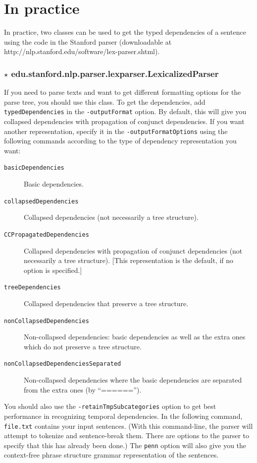 \documentclass[11pt,letterpaper]{article}
\begin{document}
\section{In practice}\label{in_practice}

In practice, two classes can be used to get the typed dependencies of a sentence using the code in the Stanford parser (downloadable at \textsf{http://nlp.stanford.edu/software/lex-parser.shtml}).

\subsubsection*{$\star$ \textbf{edu.stanford.nlp.parser.lexparser.LexicalizedParser}}

If you need to parse texts and want to get different formatting options for the parse tree, you should use this class. To get the dependencies, add \texttt{typedDependencies} in the \texttt{-outputFormat} option. By default, this will give you collapsed dependencies with propagation of conjunct dependencies. If you want another representation, specify it in the \texttt{-outputFormatOptions} using the following commands according to the type of dependency representation you want:

\begin{description}
\item[\texttt{basicDependencies}] Basic dependencies.
\item[\texttt{collapsedDependencies}] Collapsed dependencies (not necessarily a tree structure).
\item[\texttt{CCPropagatedDependencies}] Collapsed dependencies with propagation of conjunct
dependencies (not necessarily a tree structure).  [This representation is the default, if no option is specified.]
\item[\texttt{treeDependencies}] Collapsed dependencies that preserve a tree structure.
\item[\texttt{nonCollapsedDependencies}]  Non-collapsed dependencies: basic dependencies as well as
 the extra ones which do not preserve a tree structure.
\item[\texttt{nonCollapsedDependenciesSeparated}] Non-collapsed dependencies where the basic dependencies
are separated from the extra ones (by ``======'').
\end{description}

\noindent You should also use the \texttt{-retainTmpSubcategories}
option to get best performance in recognizing temporal
dependencies. In the following command, \texttt{file.txt} contains
your input sentences.  (With this command-line, the parser will
attempt to tokenize and sentence-break them. There are options to the
parser to specify that this has already been done.) The \texttt{penn}
option will also give you the context-free phrase structure grammar
representation of the sentences.
\end{document}
